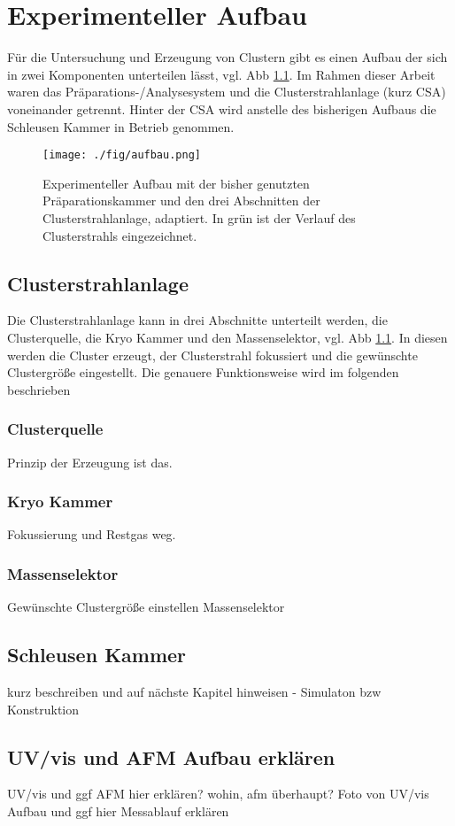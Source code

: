 \chapter{Experimenteller Aufbau}
Für die Untersuchung und Erzeugung von Clustern gibt es einen Aufbau der sich in zwei Komponenten unterteilen lässt, vgl. Abb \ref{fig:aufbau}.
Im Rahmen dieser Arbeit waren das Präparations-/Analysesystem und die Clusterstrahlanlage (kurz CSA) voneinander getrennt.
Hinter der CSA wird anstelle des bisherigen Aufbaus die Schleusen Kammer in Betrieb genommen.
\begin{figure}
    \centering
    \texttt{[image: ./fig/aufbau.png]}
    \caption{Experimenteller Aufbau mit der bisher genutzten Präparationskammer und den drei Abschnitten der Clusterstrahlanlage, \cite[S. 20]{wolter} adaptiert. 
    In grün ist der Verlauf des Clusterstrahls eingezeichnet.}
    \label{fig:aufbau}
\end{figure}
\section{Clusterstrahlanlage}
Die Clusterstrahlanlage kann in drei Abschnitte unterteilt werden, die Clusterquelle, die Kryo Kammer und den Massenselektor, vgl. Abb \ref{fig:aufbau}.
In diesen werden die Cluster erzeugt, der Clusterstrahl fokussiert und die gewünschte Clustergröße eingestellt. Die genauere Funktionsweise wird im folgenden beschrieben
\subsection{Clusterquelle}
Prinzip der Erzeugung ist das.
\subsection{Kryo Kammer}
Fokussierung und Restgas weg.
\subsection{Massenselektor}
Gewünschte Clustergröße einstellen 
Massenselektor \cite{Issendorff.1999}
\section{Schleusen Kammer}
kurz beschreiben und auf nächste Kapitel hinweisen - Simulaton bzw Konstruktion

\section{UV/vis und AFM Aufbau erklären}
UV/vis und ggf AFM hier erklären? wohin, afm überhaupt?
Foto von UV/vis Aufbau und ggf hier Messablauf erklären
